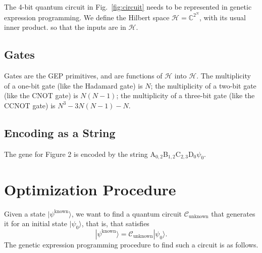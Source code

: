 \documentclass{article}
\begin{document}
The 4-bit quantum circuit in Fig.~\ref{fig:circuit} needs to be represented in genetic expression programming.
We define the Hilbert space $\mathcal{H}=\mathbb{C}^{2^N}$, with its usual inner product.
so that the inputs are in $\mathcal{H}$.

\subsection{Gates}
Gates are the GEP primitives, and are functions of $\mathcal{H}$ into $\mathcal{H}$.
The multiplicity of a one-bit gate (like the Hadamard gate) is $N$;
the multiplicity of a two-bit gate (like the CNOT gate) is $N(N-1)$;
the multiplicity of a three-bit gate (like the CCNOT gate) is $N^3-3N(N-1)-N$.

\subsection{Encoding as a String}
The gene for Figure 2 is encoded by the string A$_{0,2}$B$_{1,2}$C$_{2,3}$D$_0\psi_0$.

\section{Optimization Procedure}
Given a state $|\psi^{\textrm{known}}\rangle$, we want to find a quantum
circuit $\mathcal{C}_{\textrm{unknown}}$ that generates it for an initial state $|\psi_0\rangle$,
that is, that satisfies 
\begin{equation}
	|\psi^{\textrm{known}}\rangle=\mathcal{C}_{\textrm{unknown}}|\psi_0\rangle.
\end{equation}
The genetic expression programming procedure to find such a circuit is as follows.
\end{document}

